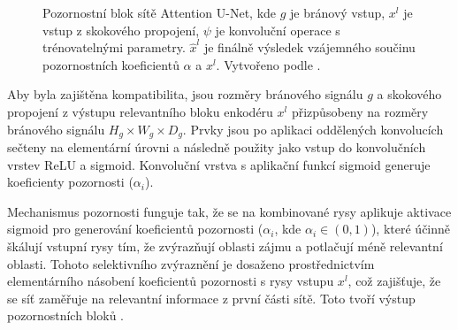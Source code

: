 \begin{figure}[H]
\caption[Pozornostní blok sítě Attention U-Net]{Pozornostní blok sítě Attention U-Net, kde $g$ je bránový vstup, $x^l$ je vstup z skokového propojení, $\psi$ je konvoluční operace s trénovatelnými parametry. $\hat{x}^l$ je finálně výsledek vzájemného součinu pozornostních koeficientů $\alpha$ a $x^l$. Vytvořeno podle \cite{attentionunet}. }
\label{fig:attention_unet}
\end{figure}

Aby byla zajištěna kompatibilita, jsou rozměry bránového signálu $g$ a skokového propojení z výstupu relevantního bloku enkodéru $x^l$ přizpůsobeny na rozměry bránového signálu $H_g \times W_g \times D_g$. Prvky jsou po aplikaci oddělených konvolucích sečteny na elementární úrovni a následně použity jako vstup do konvolučních vrstev ReLU a sigmoid. Konvoluční vrstva s aplikační funkcí sigmoid generuje koeficienty pozornosti ($\alpha_i$).

Mechanismus pozornosti funguje tak, že se na kombinované rysy aplikuje aktivace sigmoid pro generování koeficientů pozornosti (\(\alpha_i\), kde \(\alpha_i \in (0, 1)\)), které účinně škálují vstupní rysy tím, že zvýrazňují oblasti zájmu a potlačují méně relevantní oblasti. Tohoto selektivního zvýraznění je dosaženo prostřednictvím elementárního násobení koeficientů pozornosti s rysy vstupu $x^l$, což zajišťuje, že se síť zaměřuje na relevantní informace z první části sítě. Toto tvoří výstup pozornostních bloků \cite{attentionunet}.

\endinput